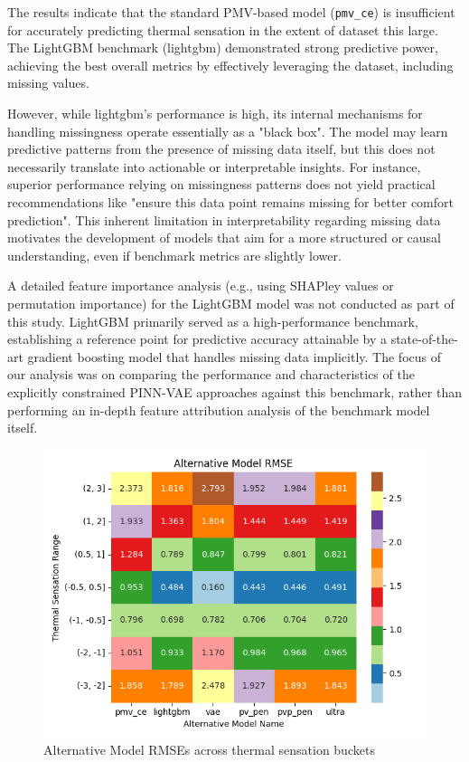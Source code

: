 The results indicate that the standard PMV-based model (\texttt{pmv\_ce}) is insufficient for accurately predicting thermal sensation in the extent of dataset this large. The LightGBM benchmark (lightgbm) demonstrated strong predictive power, achieving the best overall metrics by effectively leveraging the dataset, including missing values.

However, while lightgbm's performance is high, its internal mechanisms for handling missingness operate essentially as a "black box". The model may learn predictive patterns from the presence of missing data itself, but this does not necessarily translate into actionable or interpretable insights. For instance, superior performance relying on missingness patterns does not yield practical recommendations like "ensure this data point remains missing for better comfort prediction". This inherent limitation in interpretability regarding missing data motivates the development of models that aim for a more structured or causal understanding, even if benchmark metrics are slightly lower.

A detailed feature importance analysis (e.g., using SHAPley values or permutation importance) for the LightGBM model was not conducted as part of this study. LightGBM primarily served as a high-performance benchmark, establishing a reference point for predictive accuracy attainable by a state-of-the-art gradient boosting model that handles missing data implicitly. The focus of our analysis was on comparing the performance and characteristics of the explicitly constrained PINN-VAE approaches against this benchmark, rather than performing an in-depth feature attribution analysis of the benchmark model itself.

\begin{figure}[h!]
    \centering
    \includegraphics[width=0.5\linewidth]{fig/rmse_all_7.png}
    \caption{Alternative Model RMSEs across thermal sensation buckets}
    \label{fig:rmse-7bucket}
\end{figure}

